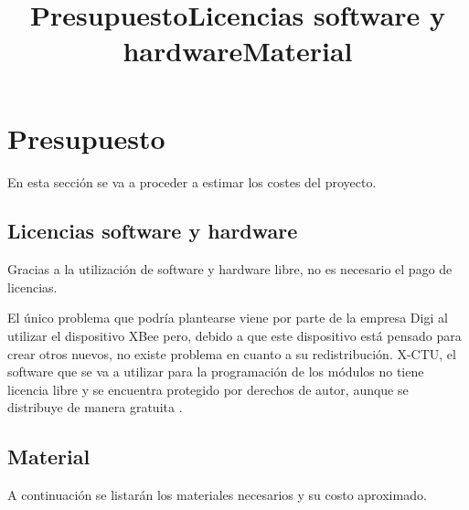 \section{Presupuesto}
\title{Presupuesto}

En esta sección se va a proceder a estimar los costes del proyecto.

\subsection{Licencias software y hardware}
\title{Licencias software y hardware}

Gracias a la utilización de software y hardware libre, no es necesario el pago de licencias.

El único problema que podría plantearse viene por parte de la empresa Digi al utilizar
el dispositivo XBee pero, debido a que este dispositivo está pensado para crear otros
nuevos, no existe problema en cuanto a su redistribución. X-CTU, el software que se va a
utilizar para la programación de los módulos no tiene licencia libre y se encuentra protegido
por derechos de autor, aunque se distribuye de manera gratuita \cite{licenciaXCTU}.


\subsection{Material}
\title{Material}

A continuación se listarán los materiales necesarios y su costo aproximado.

